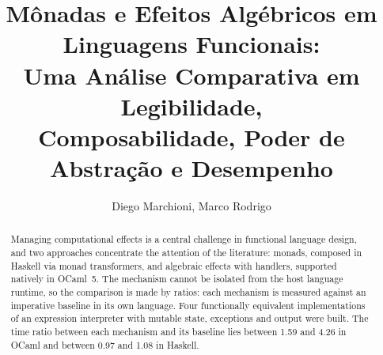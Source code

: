 \documentclass[12pt]{article}
\title{Mônadas e Efeitos Algébricos em Linguagens Funcionais:\\
Uma Análise Comparativa em Legibilidade,\\
Composabilidade, Poder de Abstração e Desempenho}
\author{Diego Marchioni\inst{1}, Marco Rodrigo\inst{1}}
\newcommand{\FaixaRTenHaskell}{0.97 and 1.08}
\newcommand{\FaixaRTenOcaml}{1.59 and 4.26}
\begin{document}
\maketitle

\begin{abstract}
Managing computational effects is a central challenge in functional language
design, and two approaches concentrate the attention of the literature:
monads, composed in Haskell via monad transformers, and algebraic effects with
handlers, supported natively in OCaml~5. The mechanism cannot be isolated from
the host language runtime, so the comparison is made by ratios: each mechanism
is measured against an imperative baseline in its own language. Four
functionally equivalent implementations of an expression interpreter with
mutable state, exceptions and output were built. The time ratio between each mechanism and
its baseline lies between \FaixaRTenOcaml{} in OCaml and between
\FaixaRTenHaskell{} in Haskell.
\end{abstract}
\end{document}
